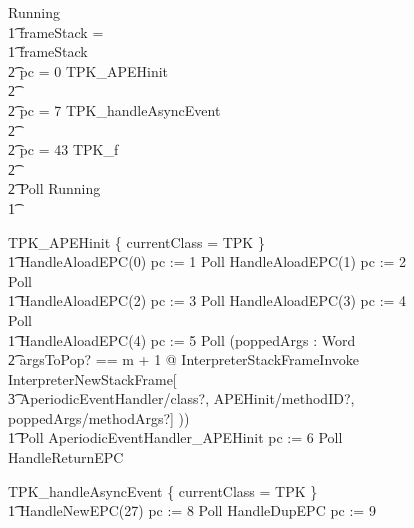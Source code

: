 \begin{figure}[p!]
  \setlength{\zedindent}{0cm}
  \setlength{\zedtab}{0.5cm}
  \setlength{\zedleftsep}{0.1cm}
  \begin{circus}
    Running \circdef \\
    \t1 \circif frameStack = \emptyset \circthen \Skip \\
    \t1 {} \circelse frameStack \neq \emptyset \circthen {} \\
    \t2 {} \circif pc = 0 \circthen TPK\_APEHinit \\
    \t2 {} \cdots {} \\
    \t2 {} \circelse pc = 7 \circthen TPK\_handleAsyncEvent \\
    \t2 {} \cdots {} \\
    \t2 {} \circelse pc = 43 \circthen TPK\_f \\
    \t2 {} \cdots {} \\
    \t2 \circfi \circseq Poll \circseq Running \\
    \t1 \circfi
  \end{circus}
  \vspace{-1cm}
  \begin{circus}
    TPK\_APEHinit \circdef \{ currentClass = TPK \} \circseq \\
    \t1 HandleAloadEPC(0) \circseq pc := 1 \circseq Poll \circseq HandleAloadEPC(1) \circseq pc := 2 \circseq Poll \circseq \\
    \t1 HandleAloadEPC(2) \circseq pc := 3 \circseq Poll \circseq HandleAloadEPC(3) \circseq pc := 4 \circseq Poll \circseq \\
    \t1 HandleAloadEPC(4) \circseq pc := 5 \circseq Poll \circseq (\circvar poppedArgs : \seq Word \circspot \\
    \t2 \lschexpract \exists argsToPop? == m + 1 @ InterpreterStackFrameInvoke \rschexpract \circseq \lschexpract InterpreterNewStackFrame[\\
    \t3 AperiodicEventHandler/class?, APEHinit/methodID?, poppedArgs/methodArgs?] \rschexpract)) \circseq \\
    \t1 Poll \circseq AperiodicEventHandler\_APEHinit \circseq pc := 6 \circseq Poll \circseq HandleReturnEPC \\
  \end{circus}
  \vspace{-1cm}
  \begin{circus}
    TPK\_handleAsyncEvent \circdef \{ currentClass = TPK \} \circseq \\
    \t1 HandleNewEPC(27) \circseq pc := 8 \circseq Poll \circseq HandleDupEPC \circseq pc := 9 \circseq \\

\end{circus}
\end{figure}
